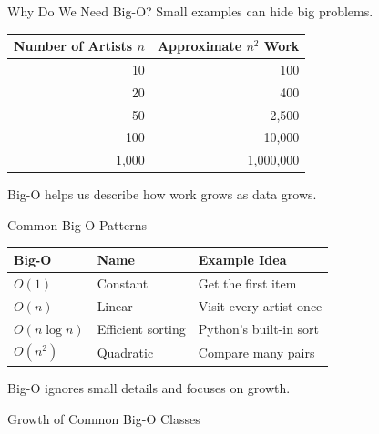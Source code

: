 \documentclass[11pt,aspectratio=43]{beamer}
\begin{document}
\begin{frame}{Why Do We Need Big-O?}
  Small examples can hide big problems.

  \begin{center}
    \begin{tabular}{r r}
      \toprule
      Number of Artists $n$ & Approximate $n^2$ Work \\
      \midrule
      10 & 100 \\
      20 & 400 \\
      50 & 2,500 \\
      100 & 10,000 \\
      1,000 & 1,000,000 \\
      \bottomrule
    \end{tabular}
  \end{center}

  \vspace{0.3cm}
  Big-O helps us describe how work grows as data grows.
\end{frame}

\begin{frame}{Common Big-O Patterns}
  \begin{center}
    \begin{tabular}{l l l}
      \toprule
      Big-O & Name & Example Idea \\
      \midrule
      $O(1)$ & Constant & Get the first item \\
      $O(n)$ & Linear & Visit every artist once \\
      $O(n \log n)$ & Efficient sorting & Python's built-in sort \\
      $O(n^2)$ & Quadratic & Compare many pairs \\
      \bottomrule
    \end{tabular}
  \end{center}

  \vspace{0.3cm}
  Big-O ignores small details and focuses on growth.
\end{frame}

\begin{frame}{Growth of Common Big-O Classes}
  \begin{center}
  \end{center}
\end{frame}
\end{document}
